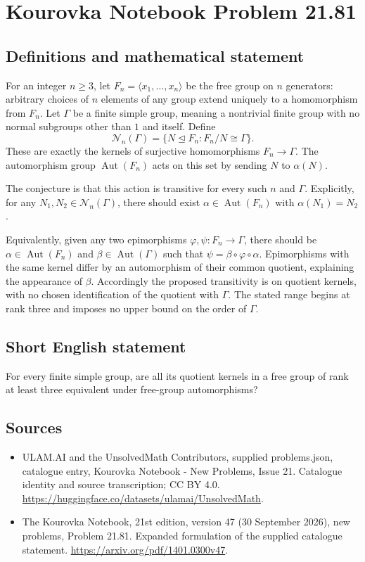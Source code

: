 \documentclass[11pt,a4paper]{article}
\begin{document}
\section*{Kourovka Notebook Problem 21.81}\label{statement}

\subsection{Definitions and mathematical statement}
For an integer $n\ge3$, let $F_n=\langle x_1,\ldots,x_n\rangle$ be the free group on $n$ generators: arbitrary choices of $n$ elements of any group extend uniquely to a homomorphism from $F_n$. Let $\Gamma$ be a finite simple group, meaning a nontrivial finite group with no normal subgroups other than $1$ and itself. Define
\[
 \mathcal N_n(\Gamma)=\{N\trianglelefteq F_n:F_n/N\cong\Gamma\}.
\]
These are exactly the kernels of surjective homomorphisms $F_n\to\Gamma$. The automorphism group $\operatorname{Aut}(F_n)$ acts on this set by sending $N$ to $\alpha(N)$.

The conjecture is that this action is transitive for every such $n$ and $\Gamma$. Explicitly, for any $N_1,N_2\in\mathcal N_n(\Gamma)$, there should exist $\alpha\in\operatorname{Aut}(F_n)$ with $\alpha(N_1)=N_2$.

Equivalently, given any two epimorphisms $\varphi,\psi:F_n\to\Gamma$, there should be $\alpha\in\operatorname{Aut}(F_n)$ and $\beta\in\operatorname{Aut}(\Gamma)$ such that $\psi=\beta\circ\varphi\circ\alpha$. Epimorphisms with the same kernel differ by an automorphism of their common quotient, explaining the appearance of $\beta$. Accordingly the proposed transitivity is on quotient kernels, with no chosen identification of the quotient with $\Gamma$. The stated range begins at rank three and imposes no upper bound on the order of $\Gamma$.
\subsection{Short English statement}
For every finite simple group, are all its quotient kernels in a free group of rank at least three equivalent under free-group automorphisms?
\subsection{Sources}
\begin{itemize}
\item[S1] ULAM.AI and the UnsolvedMath Contributors, supplied problems.json, catalogue entry, Kourovka Notebook - New Problems, Issue 21. Catalogue identity and source transcription; CC BY 4.0.
\url{https://huggingface.co/datasets/ulamai/UnsolvedMath}.
\item[S2] The Kourovka Notebook, 21st edition, version 47 (30 September 2026), new problems, Problem 21.81. Expanded formulation of the supplied catalogue statement.
\url{https://arxiv.org/pdf/1401.0300v47}.
\end{itemize}
\end{document}
